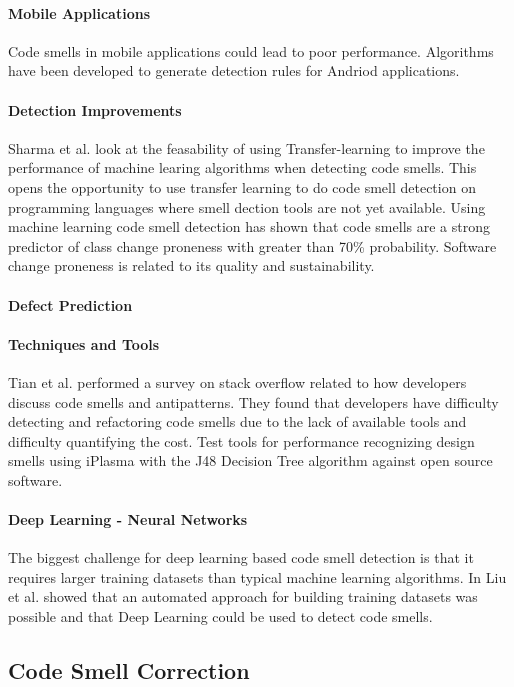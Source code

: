 \documentclass[conference]{IEEEtran}
\begin{document}
\paragraph{Mobile Applications}
Code smells in mobile applications could lead to poor performance. Algorithms have been developed\cite{rubin_sniffing_2019} to generate detection rules for Andriod applications.
\paragraph{Detection Improvements}
Sharma et al.\cite{sharma_feasibility_2019} look at the feasability of using Transfer-learning to improve the performance of machine learing algorithms when detecting code smells. This opens the opportunity to use transfer learning to do code smell detection on programming languages where smell dection tools are not yet available.
Using machine learning code smell detection has shown that code smells are a strong predictor of class change proneness\cite{pritam_assessment_2019} with greater than 70\% probability. Software change proneness is related to its quality and sustainability.
\paragraph{Defect Prediction}
\paragraph{Techniques and Tools}
Tian et al.\cite{tian_how_2019} performed a survey on stack overflow related to how developers discuss code smells and antipatterns. 
They found that developers have difficulty detecting and refactoring code smells due to the lack of available tools and difficulty quantifying the cost.
Test tools for performance recognizing design smells using iPlasma with the J48 Decision Tree algorithm\cite{singh_systematic_2018} against open source software.
\paragraph{Deep Learning - Neural Networks} The biggest challenge for deep learning based code smell detection\cite{liu_deep_2019} is that it requires larger training datasets than typical machine learning algorithms. In \cite{liu_deep_2019} Liu et al. showed that an automated approach for building training datasets was possible and that Deep Learning could be used to detect code smells.
\subsection{Code Smell Correction}
\end{document}
